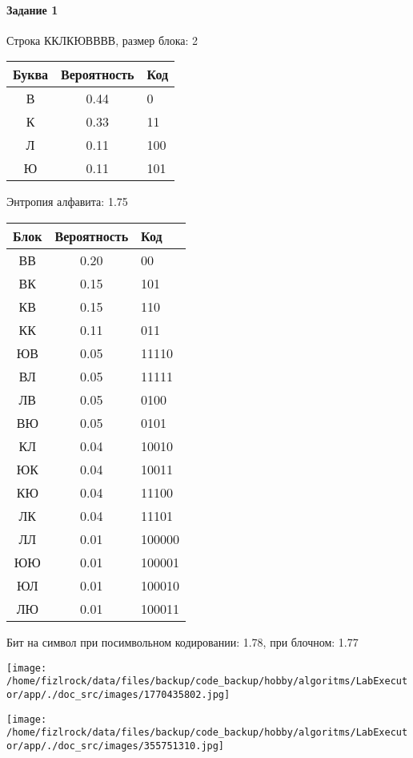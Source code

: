 \documentclass[a4paper, 12pt]{article}
\begin{document}
\paragraph{Задание 1}

Строка ККЛКЮВВВВ, размер блока: 2
\begin{center}
 \begin{tabular}{ |c|c|l| } 
  \hline
     Буква & Вероятность & Код\\ \hline
В & 0.44 & 0\\\hline
К & 0.33 & 11\\\hline
Л & 0.11 & 100\\\hline
Ю & 0.11 & 101
\\ \hline \end{tabular}
\end{center}
Энтропия алфавита: 1.75
\begin{center}
 \begin{tabular}{ |c|c|l| } 
  \hline
     Блок & Вероятность & Код\\ \hline
ВВ & 0.20 & 00\\\hline
ВК & 0.15 & 101\\\hline
КВ & 0.15 & 110\\\hline
КК & 0.11 & 011\\\hline
ЮВ & 0.05 & 11110\\\hline
ВЛ & 0.05 & 11111\\\hline
ЛВ & 0.05 & 0100\\\hline
ВЮ & 0.05 & 0101\\\hline
КЛ & 0.04 & 10010\\\hline
ЮК & 0.04 & 10011\\\hline
КЮ & 0.04 & 11100\\\hline
ЛК & 0.04 & 11101\\\hline
ЛЛ & 0.01 & 100000\\\hline
ЮЮ & 0.01 & 100001\\\hline
ЮЛ & 0.01 & 100010\\\hline
ЛЮ & 0.01 & 100011
\\ \hline \end{tabular}
\end{center}
Бит на символ при посимвольном кодировании: 1.78, при блочном: 1.77

\texttt{[image: /home/fizlrock/data/files/backup/code\_backup/hobby/algoritms/LabExecutor/app/./doc\_src/images/1770435802.jpg]}

\texttt{[image: /home/fizlrock/data/files/backup/code\_backup/hobby/algoritms/LabExecutor/app/./doc\_src/images/355751310.jpg]}
\end{document}
